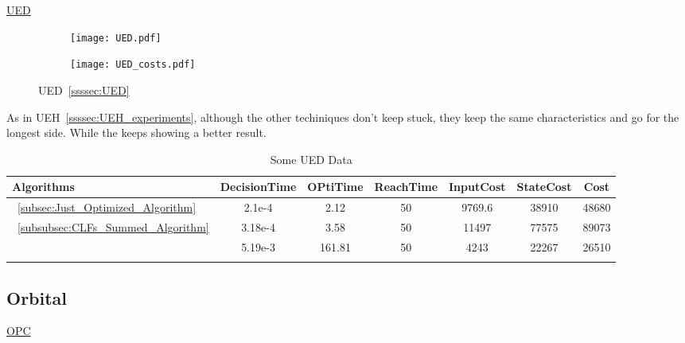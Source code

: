 \newpage %

\underline{UED}
\label{UED_experiments} %

 \begin{figure}[htbp]
  \begin{subfigure}{0.5\textwidth}
    \centering
    \texttt{[image: UED.pdf]}
  \label{fig:UED_CostEvol}
  \end{subfigure}
  \begin{subfigure}{0.6\textwidth}
    \centering
    \texttt{[image: UED\_costs.pdf]}
  \label{fig:UED_trajectory}
  \end{subfigure}
  \caption{UED~\ref{ssssec:UED}}
\label{fig:UEDTrajectory_and_CostEvol}
\end{figure}


As in UEH~\ref{ssssec:UEH_experiments}, although the other techiniques don't keep stuck, they keep the same characteristics and go for the longest side. While the  keeps showing a better result.


  \bgroup
 \begin{xltabular}{\textwidth}{|l|cccccc|}
   \toprule
   Algorithms   & DecisionTime & OPtiTime & ReachTime  & InputCost   & StateCost & Cost           \\
   \midrule
    ~\ref{subsec:Just_Optimized_Algorithm}           & 2.1e-4  & 2.12 & 50 & 9769.6 & 38910  & 48680 \\
    ~\ref{subsubsec:CLFs_Summed_Algorithm}        & 3.18e-4 & 3.58 & 50 & 11497 & 77575 & 89073  \\
                                                      & 5.19e-3 & 161.81& 50  & 4243 & 22267 & 26510 \\
    \midrule
    \caption{Some UED Data}
    \label{tab:Some_UED_Data}\\
   \end{xltabular}
 \egroup

 \newpage

\subsection{Orbital}
\label{subsec:orbital_experiments}

\underline{OPC}
\label{OPC_experiments} %

